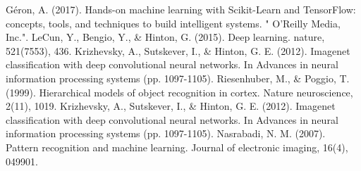 \begin{thebibliography}{}
Géron, A. (2017). Hands-on machine learning with Scikit-Learn and TensorFlow: concepts, tools, and techniques to build intelligent systems. " O'Reilly Media, Inc.".
LeCun, Y., Bengio, Y., \& Hinton, G. (2015). Deep learning. nature, 521(7553), 436.
Krizhevsky, A., Sutskever, I., \& Hinton, G. E. (2012). Imagenet classification with deep convolutional neural networks. In Advances in neural information processing systems (pp. 1097-1105).
Riesenhuber, M., & Poggio, T. (1999). Hierarchical models of object recognition in cortex. Nature neuroscience, 2(11), 1019.
Krizhevsky, A., Sutskever, I., \& Hinton, G. E. (2012). Imagenet classification with deep convolutional neural networks. In Advances in neural information processing systems (pp. 1097-1105).
Nasrabadi, N. M. (2007). Pattern recognition and machine learning. Journal of electronic imaging, 16(4), 049901.

\end{thebibliography}




